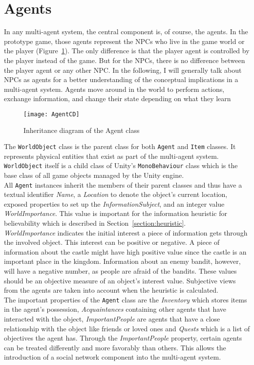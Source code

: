 \section{Agents}
In any multi-agent system, the central component is, of course, the agents. In the prototype game, those agents represent the NPCs who live in the game world or the player (Figure~\ref{fig:agentCD}). The only difference is that the player agent is controlled by the player instead of the game. But for the NPCs, there is no difference between the player agent or any other NPC. In the following, I will generally talk about NPCs as agents for a better understanding of the conceptual implications in a multi-agent system. Agents move around in the world to perform actions, exchange information, and change their state depending on what they learn
\begin{figure}
	\centering
	\texttt{[image: AgentCD]}
	\caption{Inheritance diagram of the Agent class}
	\label{fig:agentCD}
\end{figure}
The \verb|WorldObject| class is the parent class for both \verb|Agent| and \verb|Item| classes. It represents physical entities that exist as part of the multi-agent system. \verb|WorldObject| itself is a child class of Unity's \verb|MonoBehaviour| class which is the base class of all game objects managed by the Unity engine.\\
All \verb|Agent| instances inherit the members of their parent classes and thus have a textual identifier \textit{Name}, a \textit{Location} to denote the object's current location, exposed properties to set up the \textit{InformationSubject}, and an integer value \textit{WorldImportance}. This value is important for the information heuristic for believability which is described in Section~\ref{section:heuristic}.\\
\textit{WorldImportance} indicates the initial interest a piece of information gets through the involved object. This interest can be positive or negative. A piece of information about the castle might have high positive value since the castle is an important place in the kingdom. Information about an enemy bandit, however, will have a negative number, as people are afraid of the bandits. These values should be an objective measure of an object's interest value. Subjective views from the agents are taken into account when the heuristic is calculated.\\
The important properties of the \verb|Agent| class are the \textit{Inventory} which stores items in the agent's possession, \textit{Acquaintances} containing other agents that have interacted with the object, \textit{ImportantPeople} are agents that have a close relationship with the object like friends or loved ones and \textit{Quests} which is a list of objectives the agent has. Through the \textit{ImportantPeople} property, certain agents can be treated differently and more favorably than others. This allows the introduction of a social network component into the multi-agent system.\\
